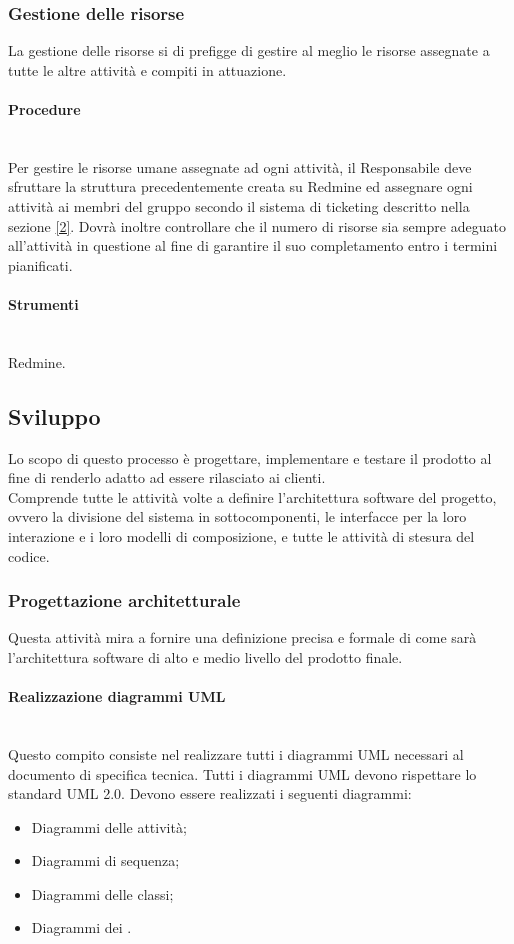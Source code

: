 \subsubsection{Gestione delle risorse}
La gestione delle risorse si di prefigge di gestire al meglio le risorse assegnate a tutte le altre attivit\`{a} e compiti in attuazione.
\paragraph{Procedure} \hfill \\
Per gestire le risorse umane assegnate ad ogni attivit\`{a}, il Responsabile deve sfruttare la struttura precedentemente creata su Redmine ed assegnare ogni attivit\`{a} ai membri del gruppo secondo il sistema di ticketing descritto nella sezione \ref{2}.
Dovrà inoltre controllare che il numero di risorse sia sempre adeguato all'attivit\`{a} in questione al fine di garantire il suo completamento entro i termini pianificati.

\paragraph{Strumenti} \hfill \\
Redmine.


\subsection{Sviluppo}
Lo scopo di questo processo è progettare, implementare e testare il prodotto al fine di renderlo adatto ad essere rilasciato ai clienti.\\
Comprende tutte le attivit\`{a} volte a definire l'architettura software del progetto, ovvero la divisione del sistema in sottocomponenti, le interfacce per la loro interazione e i loro modelli di composizione, e tutte le attivit\`{a} di stesura del codice.

\subsubsection{Progettazione architetturale}
\label{prog_arch}
Questa attivit\`{a} mira a fornire una definizione precisa e formale di come sarà l'architettura software di alto e medio livello del prodotto finale.


\paragraph{Realizzazione diagrammi UML} \hfill \\
Questo compito consiste nel realizzare tutti i diagrammi UML necessari al documento di specifica tecnica.
Tutti i diagrammi UML devono rispettare lo standard UML 2.0.
Devono essere realizzati i seguenti diagrammi:
\begin{itemize}
\item Diagrammi delle attivit\`{a};
\item Diagrammi di sequenza;
\item Diagrammi delle classi;
\item Diagrammi dei .
\end{itemize}

